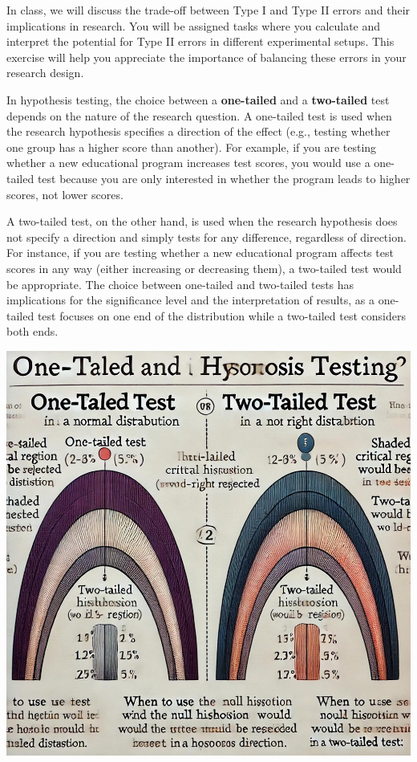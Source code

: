 \documentclass[
]{book}
\begin{document}
In class, we will discuss the trade-off between Type I and Type II errors and their implications in research. You will be assigned tasks where you calculate and interpret the potential for Type II errors in different experimental setups. This exercise will help you appreciate the importance of balancing these errors in your research design.

In hypothesis testing, the choice between a \textbf{one-tailed} and a \textbf{two-tailed} test depends on the nature of the research question. A one-tailed test is used when the research hypothesis specifies a direction of the effect (e.g., testing whether one group has a higher score than another). For example, if you are testing whether a new educational program increases test scores, you would use a one-tailed test because you are only interested in whether the program leads to higher scores, not lower scores.

A two-tailed test, on the other hand, is used when the research hypothesis does not specify a direction and simply tests for any difference, regardless of direction. For instance, if you are testing whether a new educational program affects test scores in any way (either increasing or decreasing them), a two-tailed test would be appropriate. The choice between one-tailed and two-tailed tests has implications for the significance level and the interpretation of results, as a one-tailed test focuses on one end of the distribution while a two-tailed test considers both ends.

\includegraphics[width=1\textwidth,height=\textheight]{images/fig055.jpg}
\end{document}
